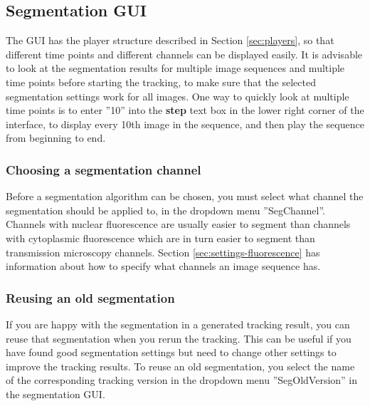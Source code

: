 \documentclass[a4paper, oneside, onecolumn, 11pt]{article}
\newcommand{\setting}[1]{''#1''}
\newcommand{\control}[1]{\textbf{#1}}
\begin{document}
\subsection{Segmentation GUI}
\label{sec:segmentation-gui}
The GUI has the player structure described in Section \ref{sec:players}, so that different time points and different channels can be displayed easily. It is advisable to look at the segmentation results for multiple image sequences and multiple time points before starting the tracking, to make sure that the selected segmentation settings work for all images. One way to quickly look at multiple time points is to enter \setting{10} into the \control{step} text box in the lower right corner of the interface, to display every 10th image in the sequence, and then play the sequence from beginning to end.

\subsubsection{Choosing a segmentation channel}
Before a segmentation algorithm can be chosen, you must select what channel the segmentation should be applied to, in the dropdown menu \setting{SegChannel}. Channels with nuclear fluorescence are usually easier to segment than channels with cytoplasmic fluorescence which are in turn easier to segment than transmission microscopy channels. Section \ref{sec:settings-fluorescence} has information about how to specify what channels an image sequence has.

\subsubsection{Reusing an old segmentation}
If you are happy with the segmentation in a generated tracking result, you can reuse that segmentation when you rerun the tracking. This can be useful if you have found good segmentation settings but need to change other settings to improve the tracking results. To reuse an old segmentation, you select the name of the corresponding tracking version in the dropdown menu \setting{SegOldVersion} in the segmentation GUI.
\end{document}
